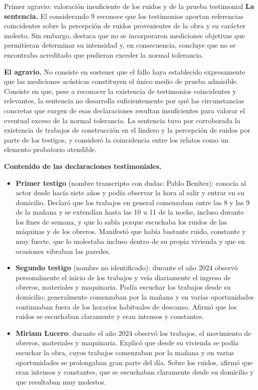 \documentclass[12pt,oneside]{book}
\begin{document}
\begin{example}{Primer agravio: valoración insuficiente de los ruidos y de la prueba testimonial}
\textbf{La sentencia.} El considerando 9 reconoce que los testimonios aportan referencias coincidentes sobre la percepción de ruidos provenientes de la obra y su carácter molesto. Sin embargo, destaca que no se incorporaron mediciones objetivas que permitieran determinar su intensidad y, en consecuencia, concluye que no se encontraba acreditado que pudieran exceder la normal tolerancia.

\textbf{El agravio.} No consiste en sostener que el fallo haya establecido expresamente que las mediciones acústicas constituyen el único medio de prueba admisible. Consiste en que, pese a reconocer la existencia de testimonios coincidentes y relevantes, la sentencia no desarrolla suficientemente por qué las circunstancias concretas que surgen de esas declaraciones resultan insuficientes para valorar el eventual exceso de la normal tolerancia. La sentencia tuvo por corroborada la existencia de trabajos de construcción en el lindero y la percepción de ruidos por parte de los testigos, y consideró la coincidencia entre los relatos como un elemento probatorio atendible.

\textbf{Contenido de las declaraciones testimoniales.}
\begin{itemize}
    \item \textbf{Primer testigo} %
    (nombre transcripto con dudas: Pablo Benítez): conocía al actor desde hacía siete años y podía observar la hora al salir y entrar en su domicilio. Declaró que los trabajos en general comenzaban entre las 8 y las 9 de la mañana y se extendían hasta las 10 u 11 de la noche, incluso durante los fines de semana, y que lo sabía porque escuchaba los ruidos de las máquinas y de los obreros. Manifestó que había bastante ruido, constante y muy fuerte, que lo molestaba incluso dentro de su propia vivienda y que en ocasiones vibraban las paredes.
    \item \textbf{Segundo testigo} %
    (nombre no identificado): durante el año 2024 observó personalmente el inicio de los trabajos y veía diariamente el ingreso de obreros, materiales y maquinaria. Podía escuchar los trabajos desde su domicilio; generalmente comenzaban por la mañana y en varias oportunidades continuaban fuera de los horarios habituales de descanso. Afirmó que los ruidos se escuchaban claramente y eran intensos y constantes.
    \item \textbf{Miriam Lucero}: durante el año 2024 observó los trabajos, el movimiento de obreros, materiales y maquinaria. Explicó que desde su vivienda se podía escuchar la obra, cuyos trabajos comenzaban por la mañana y en varias oportunidades se prolongaban gran parte del día. Sobre los ruidos, afirmó que eran intensos y constantes, que se escuchaban claramente desde su domicilio y que resultaban muy molestos.
\end{itemize}


\end{example}
\end{document}

